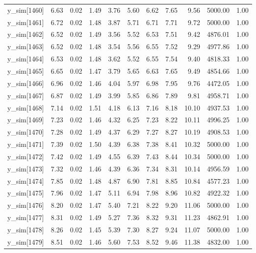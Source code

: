\begin{table}[ht]
\begin{tabular}{rrrrrrrrrrr}
  y\_sim[1460] & 6.63 & 0.02 & 1.49 & 3.76 & 5.60 & 6.62 & 7.65 & 9.56 & 5000.00 & 1.00 \\ 
  y\_sim[1461] & 6.72 & 0.02 & 1.48 & 3.87 & 5.71 & 6.71 & 7.71 & 9.72 & 5000.00 & 1.00 \\ 
  y\_sim[1462] & 6.52 & 0.02 & 1.49 & 3.56 & 5.52 & 6.53 & 7.51 & 9.42 & 4876.01 & 1.00 \\ 
  y\_sim[1463] & 6.52 & 0.02 & 1.48 & 3.54 & 5.56 & 6.55 & 7.52 & 9.29 & 4977.86 & 1.00 \\ 
  y\_sim[1464] & 6.53 & 0.02 & 1.48 & 3.62 & 5.52 & 6.55 & 7.54 & 9.40 & 4818.33 & 1.00 \\ 
  y\_sim[1465] & 6.65 & 0.02 & 1.47 & 3.79 & 5.65 & 6.63 & 7.65 & 9.49 & 4854.66 & 1.00 \\ 
  y\_sim[1466] & 6.96 & 0.02 & 1.46 & 4.04 & 5.97 & 6.98 & 7.95 & 9.76 & 4472.05 & 1.00 \\ 
  y\_sim[1467] & 6.87 & 0.02 & 1.49 & 3.99 & 5.85 & 6.86 & 7.89 & 9.81 & 4958.71 & 1.00 \\ 
  y\_sim[1468] & 7.14 & 0.02 & 1.51 & 4.18 & 6.13 & 7.16 & 8.18 & 10.10 & 4937.53 & 1.00 \\ 
  y\_sim[1469] & 7.23 & 0.02 & 1.46 & 4.32 & 6.25 & 7.23 & 8.22 & 10.11 & 4996.25 & 1.00 \\ 
  y\_sim[1470] & 7.28 & 0.02 & 1.49 & 4.37 & 6.29 & 7.27 & 8.27 & 10.19 & 4908.53 & 1.00 \\ 
  y\_sim[1471] & 7.39 & 0.02 & 1.50 & 4.39 & 6.38 & 7.38 & 8.41 & 10.32 & 5000.00 & 1.00 \\ 
  y\_sim[1472] & 7.42 & 0.02 & 1.49 & 4.55 & 6.39 & 7.43 & 8.44 & 10.34 & 5000.00 & 1.00 \\ 
  y\_sim[1473] & 7.32 & 0.02 & 1.46 & 4.39 & 6.36 & 7.34 & 8.31 & 10.14 & 4956.59 & 1.00 \\ 
  y\_sim[1474] & 7.85 & 0.02 & 1.48 & 4.87 & 6.90 & 7.81 & 8.85 & 10.84 & 4577.23 & 1.00 \\ 
  y\_sim[1475] & 7.96 & 0.02 & 1.47 & 5.11 & 6.94 & 7.98 & 8.96 & 10.82 & 4922.32 & 1.00 \\ 
  y\_sim[1476] & 8.20 & 0.02 & 1.47 & 5.40 & 7.21 & 8.22 & 9.20 & 11.06 & 5000.00 & 1.00 \\ 
  y\_sim[1477] & 8.31 & 0.02 & 1.49 & 5.27 & 7.36 & 8.32 & 9.31 & 11.23 & 4862.91 & 1.00 \\ 
  y\_sim[1478] & 8.26 & 0.02 & 1.45 & 5.39 & 7.30 & 8.27 & 9.24 & 11.07 & 5000.00 & 1.00 \\ 
  y\_sim[1479] & 8.51 & 0.02 & 1.46 & 5.60 & 7.53 & 8.52 & 9.46 & 11.38 & 4832.00 & 1.00 \\ 

\end{tabular}
\end{table}
